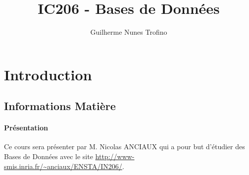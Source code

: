 \documentclass{article}
\title{IC206 - Bases de Données}
\author{Guilherme Nunes Trofino}
\begin{document}
\maketitle

\newpage\tableofcontents

\section{Introduction}



\subsection{Informations Matière}
\paragraph{Présentation}Ce cours sera présenter par M. Nicolas ANCIAUX qui a pour but d'étudier des Bases de Données avec le site \url{http://www-smis.inria.fr/~anciaux/ENSTA/IN206/}.
\end{document}
